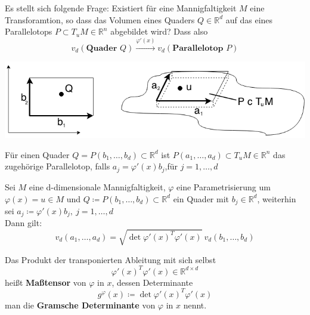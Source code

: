 Es stellt sich folgende Frage: Existiert für eine Mannigfaltigkeit $M$ eine Transforamtion, so dass das
Volumen eines Quaders $Q \in \mathbb{R}^d $ auf das eines Parallelotops 
$P \subset T_uM \in \mathbb{R}^n $ abgebildet wird? Dass also
\begin{equation*}
v_d(\textbf{Quader }Q) \xrightarrow{\varphi'(x)} v_d(\textbf{Parallelotop } P)
\end{equation*}
\begin{center}
	\includegraphics[scale=.5]{pictures/004-02.png}
\end{center}
Für einen Quader $Q = P(b_1, \ldots, b_d) \subset \mathbb{R}^d $ ist 
$P(a_1, \ldots, a_d) \subset T_uM \in \mathbb{R}^n $ das zugehörige Parallelotop, falls
$a_j = \varphi'(x) b_j $,für $ j=1, \ldots, d $

\begin{satz}
    Sei $M$ eine d-dimensionale Mannigfaltigkeit, $\varphi$ eine Parametrisierung um $\varphi(x) = u \in M $
    und $Q \coloneqq P(b_1, \ldots, b_d) \subset \mathbb{R}^d $ ein Quader mit $b_j \in \mathbb{R}^d$, weiterhin sei $a_j \coloneqq \varphi'(x) b_j,\ j= 1, \ldots, d $ \\
    Dann gilt:
    \begin{equation}
        v_d(a_1, \ldots, a_d) = 
        \sqrt{\det \varphi'(x)^T \varphi'(x)}\ v_d(b_1, \ldots, b_d)
    \end{equation}
\end{satz}

\begin{definition}[Maßtensor] Das Produkt der transponierten Ableitung mit sich selbst
	\begin{equation*}
		\varphi'(x)^T \varphi'(x) \in \mathbb{R}^{d \times d}
	\end{equation*}
    heißt \textbf{Maßtensor}    von $\varphi$ in $x$, dessen Determinante
    \begin{equation*}
		g^\varphi (x) \coloneqq \det \varphi'(x)^T \varphi'(x)
	\end{equation*}
    man die \textbf{Gramsche Determinante} von $\varphi$ in $x$ nennt.
\end{definition}

